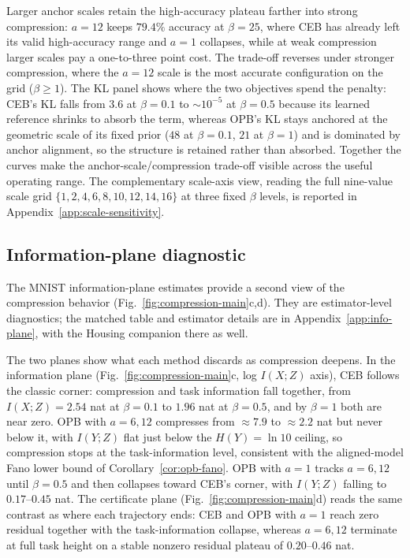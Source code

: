 Larger anchor scales retain the high-accuracy plateau farther into strong
compression: $a=12$ keeps $79.4\%$ accuracy at $\beta=25$, where CEB has already
left its valid high-accuracy range and $a=1$ collapses, while at weak compression
larger scales pay a one-to-three point cost. The trade-off reverses under stronger
compression, where the $a=12$ scale is the most accurate configuration on the grid
($\beta\ge1$). The KL panel shows where the two
objectives spend the penalty: CEB's KL falls from $3.6$ at $\beta=0.1$ to
$\sim10^{-5}$ at $\beta=0.5$ because its learned reference shrinks to absorb the
term, whereas OPB's KL stays anchored at the geometric scale of its fixed prior
($48$ at $\beta=0.1$, $21$ at $\beta=1$) and is dominated by anchor alignment, so
the structure is retained rather than absorbed. Together the curves make the
anchor-scale/compression trade-off visible across the useful operating range.
The complementary scale-axis view, reading the full nine-value scale
grid $\{1,2,4,6,8,10,12,14,16\}$ at three fixed $\beta$ levels, is reported in
Appendix~\ref{app:scale-sensitivity}.

\subsection{Information-plane diagnostic}
\label{sec:info-plane}
The MNIST information-plane estimates provide a second view of the compression
behavior (Fig.~\ref{fig:compression-main}c,d). They are estimator-level diagnostics;
the matched table and estimator details
are in Appendix~\ref{app:info-plane}, with the Housing companion there as well.

The two planes show what each method discards as compression deepens. In the
information plane (Fig.~\ref{fig:compression-main}c, log $I(X;Z)$ axis), CEB follows
the classic corner: compression and task information fall together, from
$I(X;Z)=2.54$ nat at $\beta=0.1$ to $1.96$ nat at $\beta=0.5$, and by $\beta=1$
both are near zero. OPB with $a=6,12$ compresses from $\approx7.9$ to $\approx2.2$
nat but never below it, with $I(Y;Z)$ flat just below the $H(Y)=\ln10$ ceiling, so
compression stops at the task-information level, consistent with the aligned-model
Fano lower bound of Corollary~\ref{cor:opb-fano}. OPB with $a=1$ tracks $a=6,12$ until
$\beta=0.5$ and then collapses toward CEB's corner, with $I(Y;Z)$ falling to
$0.17$--$0.45$ nat. The certificate plane
(Fig.~\ref{fig:compression-main}d) reads the same contrast as where each trajectory
ends: CEB and OPB with $a=1$ reach zero residual together with the
task-information collapse, whereas $a=6,12$ terminate at full task height on a
stable nonzero residual plateau of $0.20$--$0.46$ nat.

